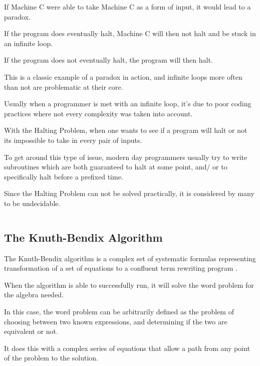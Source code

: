 \documentclass{article}
\begin{document}
\medskip\noindent
If Machine C were able to take Machine C as a form of input, it would lead to a paradox. 

\medskip\noindent
If the program does eventually halt, Machine C will then not halt and be stuck in an infinite loop. 

\medskip\noindent
If the program does not eventually halt, the program will then halt.

\medskip\noindent
This is a classic example of a paradox in action, and infinite loops more often than not are problematic at their core. 

\medskip\noindent
Usually when a programmer is met with an infinite loop, it's due to poor coding practices where not every complexity was taken into account.

\medskip\noindent
With the Halting Problem, when one wants to see if a program will halt or not its impossible to take in every pair of inputs.

\medskip\noindent
To get around this type of issue, modern day programmers usually try to write subroutines which are both guaranteed to halt at some point, and/ or to specifically halt before a prefixed time.

\medskip\noindent
Since the Halting Problem can not be solved practically, it is considered by many to be undecidable.

\medskip\medskip
\begin{lstlisting}
\end{lstlisting}

\medskip

\subsection{The Knuth-Bendix Algorithm}
\medskip\medskip
\hspace{\parindent} 

The Knuth-Bendix algorithm is a complex set of systematic formulas representing transformation of a set of equations to a confluent term rewriting program \cite{KB}. 

\medskip\noindent
When the algorithm is able to successfully run, it will solve the word problem for the algebra needed. 

\medskip\noindent
In this case, the word problem can be arbitrarily defined as the problem of choosing between two known expressions, and determining if the two are equivalent or not. 

\medskip\noindent
It does this with a complex series of equations that allow a path from any point of the problem to the solution.
\end{document}
